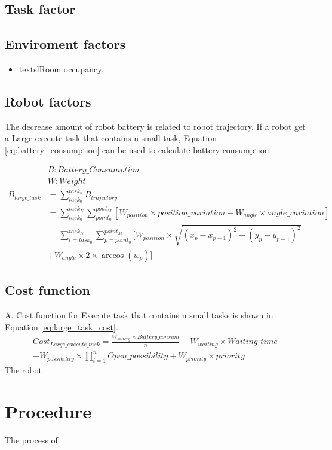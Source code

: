 \subsection{Task factor}

\subsection{Enviroment factors}
\begin{itemize}
	\item textsl{Room occupancy.}
\end{itemize}
\subsection{Robot factors}
The decrease amount of robot battery is related to robot trajectory. If a robot get a Large execute task that contains n small task, Equation \ref{eq:battery_consumption} can be used to calculate battery consumption.

\begin{equation}
\begin{aligned}
\label{eq:battery_consumption}
&B: Battery\_Consumption\\
&W: Weight \\
B_{large\_task} & = \sum_{task_0}^{task_n} B_{trajectory} \\
& = \sum_{task_0}^{task_N} \sum_{point_0}^{pont_M} [W_{position} \times position\_variation+W_{angle}  \times angle\_variation]\\
& = \sum_{t = task_0}^{task_N} \sum_{p = point_0}^{point_M} [ W_{position} \times \sqrt{(x_p-x_{p-1} )^2+(y_p-y_{p-1} )^2} \\
&   + W_{angle} \times 2 \times \arccos(w_p)] 
\end{aligned}
\end{equation}

\subsection{Cost function}
	A. Cost function for Execute task that contains n small tasks is shown in Equation \ref{eq:large_task_cost}.
\begin{equation}
	\label{eq:large_task_cost}
	\begin{split}
	Cost_{Large\_execute\_task} = \frac{W_{battery} \times Battery\_consum}{n} + W_{waiting} \times Waiting\_time \\
	+ W_{possibility} \times \prod\limits_{i=1}^n Open\_possibility  + W_{priority} \times priority
	\end{split}
\end{equation}
The robot 

\section{Procedure}
The process of 

